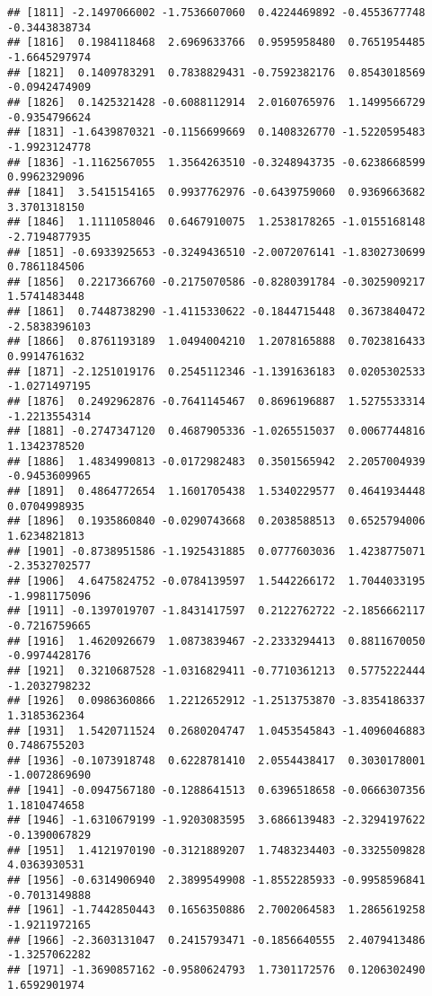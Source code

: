 \documentclass[
]{article}
\begin{document}
\begin{verbatim}
## [1811] -2.1497066002 -1.7536607060  0.4224469892 -0.4553677748 -0.3443838734
## [1816]  0.1984118468  2.6969633766  0.9595958480  0.7651954485 -1.6645297974
## [1821]  0.1409783291  0.7838829431 -0.7592382176  0.8543018569 -0.0942474909
## [1826]  0.1425321428 -0.6088112914  2.0160765976  1.1499566729 -0.9354796624
## [1831] -1.6439870321 -0.1156699669  0.1408326770 -1.5220595483 -1.9923124778
## [1836] -1.1162567055  1.3564263510 -0.3248943735 -0.6238668599  0.9962329096
## [1841]  3.5415154165  0.9937762976 -0.6439759060  0.9369663682  3.3701318150
## [1846]  1.1111058046  0.6467910075  1.2538178265 -1.0155168148 -2.7194877935
## [1851] -0.6933925653 -0.3249436510 -2.0072076141 -1.8302730699  0.7861184506
## [1856]  0.2217366760 -0.2175070586 -0.8280391784 -0.3025909217  1.5741483448
## [1861]  0.7448738290 -1.4115330622 -0.1844715448  0.3673840472 -2.5838396103
## [1866]  0.8761193189  1.0494004210  1.2078165888  0.7023816433  0.9914761632
## [1871] -2.1251019176  0.2545112346 -1.1391636183  0.0205302533 -1.0271497195
## [1876]  0.2492962876 -0.7641145467  0.8696196887  1.5275533314 -1.2213554314
## [1881] -0.2747347120  0.4687905336 -1.0265515037  0.0067744816  1.1342378520
## [1886]  1.4834990813 -0.0172982483  0.3501565942  2.2057004939 -0.9453609965
## [1891]  0.4864772654  1.1601705438  1.5340229577  0.4641934448  0.0704998935
## [1896]  0.1935860840 -0.0290743668  0.2038588513  0.6525794006  1.6234821813
## [1901] -0.8738951586 -1.1925431885  0.0777603036  1.4238775071 -2.3532702577
## [1906]  4.6475824752 -0.0784139597  1.5442266172  1.7044033195 -1.9981175096
## [1911] -0.1397019707 -1.8431417597  0.2122762722 -2.1856662117 -0.7216759665
## [1916]  1.4620926679  1.0873839467 -2.2333294413  0.8811670050 -0.9974428176
## [1921]  0.3210687528 -1.0316829411 -0.7710361213  0.5775222444 -1.2032798232
## [1926]  0.0986360866  1.2212652912 -1.2513753870 -3.8354186337  1.3185362364
## [1931]  1.5420711524  0.2680204747  1.0453545843 -1.4096046883  0.7486755203
## [1936] -0.1073918748  0.6228781410  2.0554438417  0.3030178001 -1.0072869690
## [1941] -0.0947567180 -0.1288641513  0.6396518658 -0.0666307356  1.1810474658
## [1946] -1.6310679199 -1.9203083595  3.6866139483 -2.3294197622 -0.1390067829
## [1951]  1.4121970190 -0.3121889207  1.7483234403 -0.3325509828  4.0363930531
## [1956] -0.6314906940  2.3899549908 -1.8552285933 -0.9958596841 -0.7013149888
## [1961] -1.7442850443  0.1656350886  2.7002064583  1.2865619258 -1.9211972165
## [1966] -2.3603131047  0.2415793471 -0.1856640555  2.4079413486 -1.3257062282
## [1971] -1.3690857162 -0.9580624793  1.7301172576  0.1206302490  1.6592901974

\end{verbatim}
\end{document}
